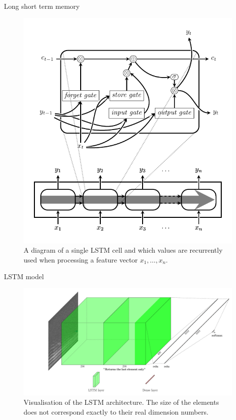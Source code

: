 \documentclass[10pt]{beamer}
\begin{document}
\begin{frame}{Long short term memory}
\begin{figure}[H]
\centering
  \includegraphics[width=.7\textwidth]{image/lstm_schema.pdf}
  \caption{A diagram of a single LSTM cell and which values are recurrently used when processing a feature vector $x_1,\hdots,x_n$.}
  \label{fig:lstm_schema}
\end{figure}
\end{frame}


\begin{frame}{LSTM model}
\begin{figure}[H]
\centering
  \includegraphics[width=1\textwidth]{image/ml_model_lstm.pdf}\hfill
  \caption{Visualisation of the LSTM architecture. The size of the elements does not correspond exactly to their real dimension numbers.}
  \label{fig:ml_model_lstm}
\end{figure}
\end{frame}
\end{document}
